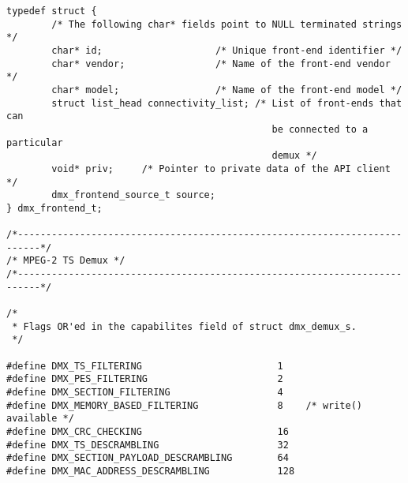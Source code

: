 \begin{verbatim}
typedef struct { 
        /* The following char* fields point to NULL terminated strings */ 
        char* id;                    /* Unique front-end identifier */ 
        char* vendor;                /* Name of the front-end vendor */ 
        char* model;                 /* Name of the front-end model */ 
        struct list_head connectivity_list; /* List of front-ends that can 
                                               be connected to a particular 
                                               demux */ 
        void* priv;     /* Pointer to private data of the API client */ 
        dmx_frontend_source_t source;
} dmx_frontend_t;

/*--------------------------------------------------------------------------*/ 
/* MPEG-2 TS Demux */ 
/*--------------------------------------------------------------------------*/ 

/* 
 * Flags OR'ed in the capabilites field of struct dmx_demux_s. 
 */ 

#define DMX_TS_FILTERING                        1 
#define DMX_PES_FILTERING                       2 
#define DMX_SECTION_FILTERING                   4 
#define DMX_MEMORY_BASED_FILTERING              8    /* write() available */ 
#define DMX_CRC_CHECKING                        16 
#define DMX_TS_DESCRAMBLING                     32 
#define DMX_SECTION_PAYLOAD_DESCRAMBLING        64 
#define DMX_MAC_ADDRESS_DESCRAMBLING            128 
\end{verbatim}

\label{demuxdemuxt}

